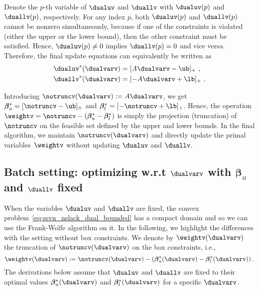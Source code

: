 \documentclass{article}
\begin{document}
Denote the $p$-th variable of $\dualuv$ and $\duallv$ with $\dualuv(p)$ and $\duallv(p)$, respectively.
For any index $p$, both $\dualuv(p)$ and $\duallv(p)$ cannot be nonzero simultaneously, because if one of the constraints is violated (either the upper or the lower bound), then the other constraint must be satisfied.
Hence, $\dualuv(p) \neq 0$ implies $\duallv(p) = 0$ and vice versa. %
Therefore, the final update equations can equivalently be written as
\begin{align}
\label{eq:optimalBetaULfinal}
\dualuv^*(\dualvarv) &= [A\dualvarv - \ub ]_+ \ , \\
\duallv^*(\dualvarv) &= [-A\dualvarv + \lb ]_+ \ .
\end{align}

Introducing $\notruncv(\dualvarv):=A\dualvarv$, we get $\bm{\beta}_u^* = [\notruncv - \ub ]_+$ and $\bm{\beta}^*_l = [-\notruncv + \lb ]_+$.
Hence, the operation $\weightv = \notruncv - (\bm{\beta}^*_u - \bm{\beta}^*_l)$ is simply the projection (truncation) of $\notruncv$ on the feasible set defined by the upper and lower bounds.
%
%
In the final algorithm, we maintain $\notruncv(\dualvarv)$ and directly update the primal variables~$\weightv$ without updating $\dualuv$ and $\duallv$.

\subsection{Batch setting: optimizing w.r.t \texorpdfstring{$\dualvarv$}{alpha} with  \texorpdfstring{$\bm{\beta}_u$}{betaU} and \texorpdfstring{$\duallv$}{betaL} fixed}
When the variables $\dualuv$ and $\duallv$ are fixed, the convex problem~\eqref{eq:ssvn_nslack_dual_bounded}
has a compact domain and so we can use the Frank-Wolfe algorithm on it.
In the following, we highlight the differences with the setting without box constraints.
We denote by $\weightv(\dualvarv)$ the truncation of $\notruncv(\dualvarv)$ on the box constraints, i.e.,
\begin{equation} \label{eq:wTruncation}
\weightv(\dualvarv) := \notruncv(\dualvarv) - \left(\bm{\beta}^*_u(\dualvarv) - \bm{\beta}^*_l (\dualvarv)\right).
\end{equation}
The derivations below assume that $\dualuv$ and $\duallv$ are fixed to their optimal values $\bm{\beta}^*_u(\dualvarv)$ and $\bm{\beta}^*_l (\dualvarv)$ for a specific $\dualvarv$.
\end{document}
